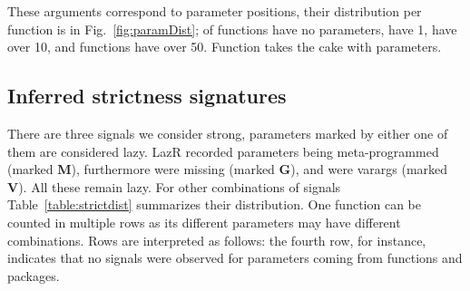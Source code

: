 \documentclass[screen,acmsmall]{acmart}
\newcommand{\lazr}{{\sf LazR}\xspace}
\begin{document}
These arguments correspond to \TotalParameterCount parameter positions, their
distribution per function is in Fig.~\ref{fig:paramDist}; \ZeroArityFunctionPerc
of functions have no parameters, \OneArityFunctionPerc have 1,
\TenArityFunctionPerc have over 10, and \FiftyArityFunctionCount functions have
over 50. Function \texttt{\MaxArityFunctionName} takes the cake with
\texttt{\MaxArityFunctionParamCount} parameters.

\subsection{Inferred strictness signatures}\label{sec:results}

There are three signals we consider strong, parameters marked by either one of
them are considered lazy. \lazr recorded \MetaCountParametersTotal parameters
being meta-programmed (marked \textbf{M}), furthermore
\MissingAlwaysCountParameters were missing (marked \textbf{G}), and
\VarargParameterCount were varargs (marked \textbf{V}). All these remain lazy.
For other combinations of signals Table~\ref{table:strictdist} summarizes their
distribution. One function can be counted in multiple rows as its different
parameters may have different combinations. Rows are interpreted as follows: the
fourth row, for instance, indicates that no signals were observed for
\TotalStrictParamCount parameters coming from \TotalStrictFunCount functions and
\TotalStrictPackCount packages.
\end{document}
